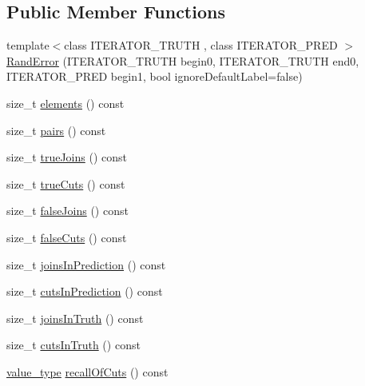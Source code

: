 \subsection*{Public Member Functions}
\begin{DoxyCompactItemize}
\item 
{\footnotesize template$<$class I\+T\+E\+R\+A\+T\+O\+R\+\_\+\+T\+R\+U\+T\+H , class I\+T\+E\+R\+A\+T\+O\+R\+\_\+\+P\+R\+E\+D $>$ }\\\hyperlink{classnifty_1_1ground__truth_1_1RandError_a4ad5e727b3445b52cfe87e5f5cd68a2f}{Rand\+Error} (I\+T\+E\+R\+A\+T\+O\+R\+\_\+\+T\+R\+U\+T\+H begin0, I\+T\+E\+R\+A\+T\+O\+R\+\_\+\+T\+R\+U\+T\+H end0, I\+T\+E\+R\+A\+T\+O\+R\+\_\+\+P\+R\+E\+D begin1, bool ignore\+Default\+Label=false)
\item 
size\+\_\+t \hyperlink{classnifty_1_1ground__truth_1_1RandError_ad439a6acad528a0d55bb8d0182bb9763}{elements} () const 
\item 
size\+\_\+t \hyperlink{classnifty_1_1ground__truth_1_1RandError_af6264967f41285e889b484a865905b66}{pairs} () const 
\item 
size\+\_\+t \hyperlink{classnifty_1_1ground__truth_1_1RandError_a65b8b7555186291fdc99e0bd633cc450}{true\+Joins} () const 
\item 
size\+\_\+t \hyperlink{classnifty_1_1ground__truth_1_1RandError_abe7c1cda41bbea6f7f4d72038123651a}{true\+Cuts} () const 
\item 
size\+\_\+t \hyperlink{classnifty_1_1ground__truth_1_1RandError_ac99ba816b395e9a949a4fda387f47c04}{false\+Joins} () const 
\item 
size\+\_\+t \hyperlink{classnifty_1_1ground__truth_1_1RandError_a34a1290d7335ede34d3cfb928034d27d}{false\+Cuts} () const 
\item 
size\+\_\+t \hyperlink{classnifty_1_1ground__truth_1_1RandError_a2d658ff5469faf7010f75d3a98ae10cc}{joins\+In\+Prediction} () const 
\item 
size\+\_\+t \hyperlink{classnifty_1_1ground__truth_1_1RandError_a37af80b186c9fb15338ba2a352712036}{cuts\+In\+Prediction} () const 
\item 
size\+\_\+t \hyperlink{classnifty_1_1ground__truth_1_1RandError_a18e5ce6958faacd343de403b78e521e7}{joins\+In\+Truth} () const 
\item 
size\+\_\+t \hyperlink{classnifty_1_1ground__truth_1_1RandError_a308ce2c713034ac8a852dbbca5983ae7}{cuts\+In\+Truth} () const 
\item 
\hyperlink{classnifty_1_1ground__truth_1_1RandError_a8ccf604387e3b5ed939c97c22c75acf9}{value\+\_\+type} \hyperlink{classnifty_1_1ground__truth_1_1RandError_a1b86b5566c60f77e902710b67465ed1c}{recall\+Of\+Cuts} () const 

\end{DoxyCompactItemize}
